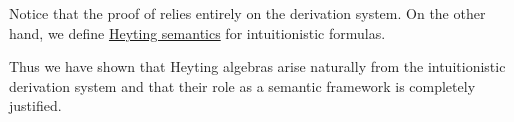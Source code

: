 \begin{remark}\label{rem:thm:intuitionistic_lindenbaum_tarski_algebra/syntactic_proof}
  Notice that the proof of  relies entirely on the derivation system. On the other hand, we define \hyperref[def:propositional_heyting_algebra_semantics]{Heyting semantics} for intuitionistic formulas.

  Thus we have shown that Heyting algebras arise naturally from the intuitionistic derivation system and that their role as a semantic framework is completely justified.
\end{remark}
